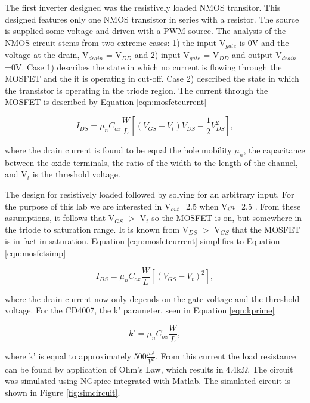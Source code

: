 

The first inverter designed was the resistively loaded NMOS transitor. This designed features only one NMOS transistor in series with a resistor. The source is supplied some voltage and driven with a PWM source. The analysis of the NMOS circuit stems from two extreme cases: 1) the input V$_{gate}$ is 0V and the voltage at the drain, V$_{drain}$ = V$_{DD}$ and 2) input V$_{gate}$ = V$_{DD}$ and output V$_{drain}$=0V. Case 1) describes the state in which no current is flowing through the MOSFET and the it is operating in cut-off. Case 2) described the state in which the transistor is operating in the triode region. The current through the MOSFET is described by Equation \ref{eqn:mosfetcurrent}

\begin{equation}
I_{DS} = \mu_n C_{ox}\frac{W}{L}[(V_{GS}-V_t)V_{DS}-\frac{1}{2}V^{2}_{DS}],
\label{eqn:mosfetcurrent}
\end{equation}

where the drain current is found to be equal the hole mobility $\mu_n$, the capacitance between the oxide terminals, the ratio of the width to the length of the channel, and V$_t$ is the threshold voltage. 
\newline

The design for resistively loaded followed by solving for an arbitrary input. For the purpose of this lab we are interested in V$_{out}$=2.5 when V$_in$=2.5 \cite{b2}. From these assumptions, it follows that V$_{GS}$ $>$ V$_t$ so the MOSFET is on, but somewhere in the triode to saturation range. It is known from V$_{DS}$ $>$ V$_{GS}$ that the MOSFET is in fact in saturation. Equation \ref{eqn:mosfetcurrent} simplifies to Equation \ref{eqn:mosfetsimp}

\begin{equation}
I_{DS} = \mu_n C_{ox}\frac{W}{L}[(V_{GS}-V_t)^2],
\label{eqn:mosfetsimp}
\end{equation}

where the drain current now only depends on the gate voltage and the threshold voltage. For the CD4007, the k' parameter, seen in Equation \ref{eqn:kprime}

\begin{equation}
k' = \mu_n C_{ox}\frac{W}{L},
\label{eqn:kprime}
\end{equation}

where k' is equal to approximately 500$\frac{\mu A}{V^2}$.
From this current the load resistance can be found by application of Ohm's Law, which results in 4.4k$\Omega$. The circuit was simulated using NGspice integrated with Matlab. The simulated circuit is shown in Figure \ref{fig:simcircuit}.


